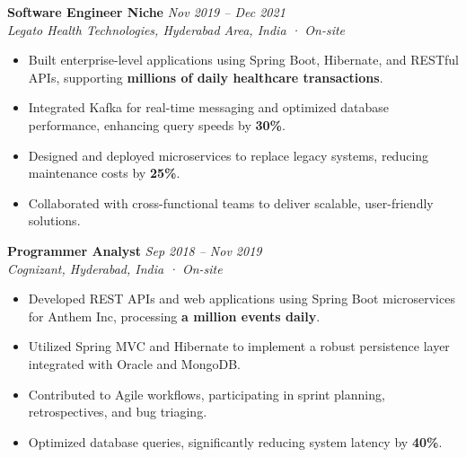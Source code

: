 \documentclass[a4paper,10pt]{article}
\begin{document}
\vspace{0.2cm}

\noindent\textbf{Software Engineer \textemdash{} Niche} \hfill \textit{Nov 2019 -- Dec 2021} \\
\textit{Legato Health Technologies, Hyderabad Area, India · On-site} \\
\vspace{-0.4cm}
\begin{itemize}[leftmargin=0.5cm, labelsep=0.3cm, itemsep=0.2em, parsep=0pt, topsep=0pt]
    \item Built enterprise-level applications using Spring Boot, Hibernate, and RESTful APIs, supporting \textbf{millions of daily healthcare transactions}.
    \item Integrated Kafka for real-time messaging and optimized database performance, enhancing query speeds by \textbf{30\%}.
    \item Designed and deployed microservices to replace legacy systems, reducing maintenance costs by \textbf{25\%}.
    \item Collaborated with cross-functional teams to deliver scalable, user-friendly solutions.
\end{itemize}

\vspace{0.2cm}

\noindent\textbf{Programmer Analyst} \hfill \textit{Sep 2018 -- Nov 2019} \\
\textit{Cognizant, Hyderabad, India · On-site} \\
\vspace{-0.4cm}
\begin{itemize}[leftmargin=0.5cm, labelsep=0.3cm, itemsep=0.2em, parsep=0pt, topsep=0pt]
    \item Developed REST APIs and web applications using Spring Boot microservices for Anthem Inc, processing \textbf{a million events daily}.
    \item Utilized Spring MVC and Hibernate to implement a robust persistence layer integrated with Oracle and MongoDB.
    \item Contributed to Agile workflows, participating in sprint planning, retrospectives, and bug triaging.
    \item Optimized database queries, significantly reducing system latency by \textbf{40\%}.
\end{itemize}

\vspace{0.2cm}
\end{document}
